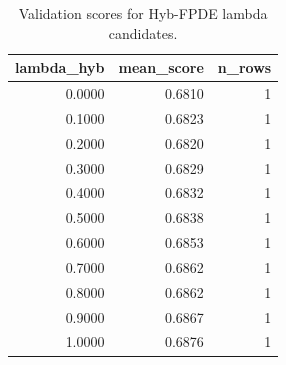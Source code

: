 \begin{table}[t]
\caption{Validation scores for Hyb-FPDE lambda candidates.}
\label{tab:lambda_distribution_computed}
\centering
\begin{tabular}{rrr}
\toprule
lambda\_hyb & mean\_score & n\_rows \\
\midrule
0.0000 & 0.6810 & 1 \\
0.1000 & 0.6823 & 1 \\
0.2000 & 0.6820 & 1 \\
0.3000 & 0.6829 & 1 \\
0.4000 & 0.6832 & 1 \\
0.5000 & 0.6838 & 1 \\
0.6000 & 0.6853 & 1 \\
0.7000 & 0.6862 & 1 \\
0.8000 & 0.6862 & 1 \\
0.9000 & 0.6867 & 1 \\
1.0000 & 0.6876 & 1 \\
\bottomrule
\end{tabular}

\end{table}
